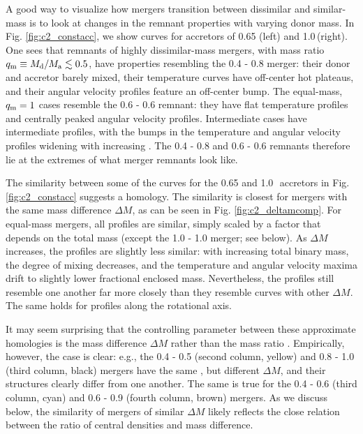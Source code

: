 A good way to visualize how mergers transition between dissimilar and similar-mass is to look at changes in the remnant properties with varying donor mass.  In Fig. \ref{fig:c2_constacc}, we show curves for accretors of 0.65 (left) and 1.0\,\Msun (right).  One sees that remnants of highly dissimilar-mass mergers, with mass ratio $\qm\equiv M_\mrm{d}/M_\mrm{a} \lesssim0.5$, have properties resembling the 0.4 - 0.8 {\Msun} merger: their donor and accretor barely mixed, their temperature curves have off-center hot plateaus, and their angular velocity profiles feature an off-center bump.  The equal-mass, $\qm=1$ cases resemble the 0.6 - 0.6 {\Msun} remnant: they have flat temperature profiles and centrally peaked angular velocity profiles.  Intermediate cases have intermediate profiles, with the bumps in the temperature and angular velocity profiles widening with increasing {\qm}.  The 0.4 - 0.8 {\Msun} and 0.6 - 0.6 {\Msun} remnants therefore lie at the extremes of what merger remnants look like.


The similarity between some of the curves for the 0.65 and 1.0\,\Msun\ accretors in Fig. \ref{fig:c2_constacc} suggests a homology.  The similarity is closest for mergers with the same mass difference $\Delta M$, as can be seen in Fig. \ref{fig:c2_deltamcomp}.
For equal-mass mergers, all profiles are similar, simply scaled by a factor that depends on the total mass (except the 1.0 - 1.0 {\Msun} merger; see below).  As $\Delta M$ increases, the profiles are slightly less similar: with increasing total binary mass, the degree of mixing decreases, and the temperature and angular velocity maxima drift to slightly lower fractional enclosed mass.  Nevertheless, the profiles still resemble one another far more closely than they resemble curves with other $\Delta M$.  The same holds for profiles along the rotational axis.

It may seem surprising that the controlling parameter between these approximate homologies is the mass difference $\Delta M$ rather than the mass ratio {\qm}.  Empirically, however, the case is clear: e.g., the 0.4 - 0.5 (second column, yellow) and 0.8 - 1.0 {\Msun} (third column, black) mergers have the same {\qm}, but different $\Delta M$, and their structures clearly differ from one another.  The same is true for the 0.4 - 0.6 (third column, cyan) and 0.6 - 0.9 (fourth column, brown) {\Msun} mergers.  As we discuss below, the similarity of mergers of similar $\Delta M$ likely reflects the close relation between the ratio of central densities and mass difference.  

